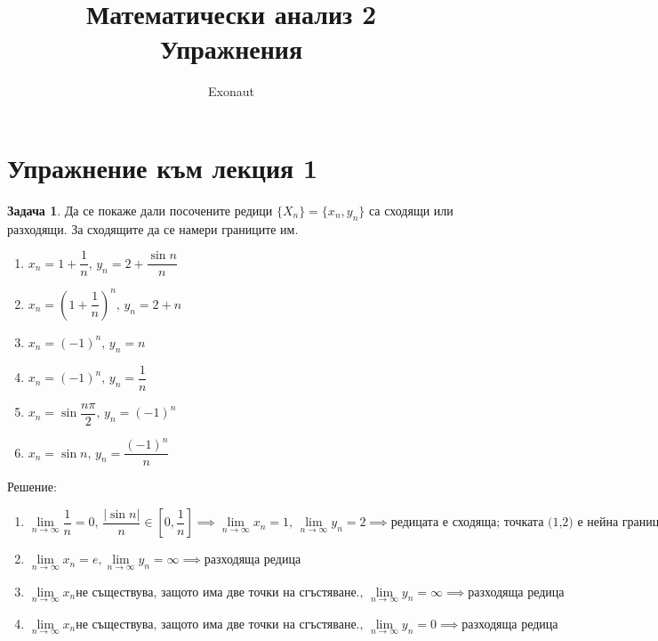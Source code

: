 \documentclass[a4paper,fleqn,12pt]{article}
\title{Математически анализ 2 \\ Упражнения}
\author{Exonaut}
\theoremstyle{definition}
\newtheorem{task}{Задача}[subsection]
\begin{document}
\maketitle

\newpage
{}

\tableofcontents
\newpage

\section{Упражнение към лекция 1}

\begin{task}
Да се покаже дали посочените редици $\{ X_n \} = \{ x_n, y_n \}$ са сходящи или разходящи. За сходящите да се намери границите им.\\
\begin{enumerate}

\item $x_n = 1 + \dfrac{1}{n}, \, y_n = 2 + \dfrac{\sin{n}}{n}$
\item $x_n = \left( 1 + \dfrac{1}{n} \right) ^n, \, y_n = 2 + n $
\item $x_n = (-1)^n, \, y_n = n$
\item $x_n = (-1)^n, \, y_n = \dfrac{1}{n}$
\item $x_n =\sin{\dfrac{n \pi }{2}}, \, y_n = (-1)^n$
\item $x_n = \sin{n}, \, y_n = \dfrac{(-1)^n}{n}$

\end{enumerate}
Решение: \\
\begin{enumerate}

\item $\lim\limits_{n \to \infty} \dfrac{1}{n} = 0, \, \dfrac{\vert \sin{n} \vert}{n} \in \left[0, \dfrac{1}{n} \right] \implies 
\lim\limits_{n \to \infty} x_n = 1, \, \lim\limits_{n \to \infty} y_n = 2 \implies 
\text{редицата е сходяща; точката (1,2) е нейна граница}$

\item $ \lim\limits_{n \to \infty} x_n = e , \lim\limits_{n \to \infty} y_n = \infty \implies 
\text{разходяща редица} $

\item $ \lim\limits_{n \to \infty} x_n \text{не съществува, защото има две точки на сгъстяване.}, \,  
\lim\limits_{n \to \infty} y_n = \infty \implies \text{разходяща редица}$

\item $\lim\limits_{n \to \infty} x_n \text{не съществува, защото има две точки на сгъстяване.}, \,  
\lim\limits_{n \to \infty} y_n = 0 \implies \text{разходяща редица}$


\end{enumerate}
\end{task}
\end{document}
